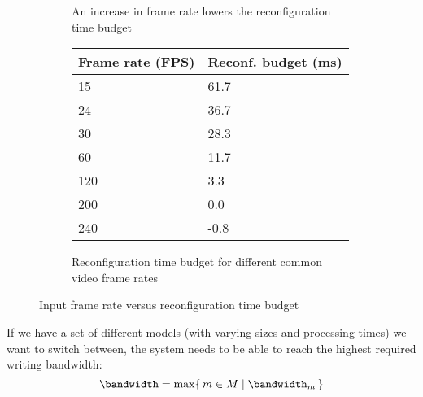 \begin{figure}[htbp]
    \centering
    \begin{subfigure}[b]{0.48\textwidth}
        \begin{adjustbox}{width=\linewidth}
        
        \end{adjustbox}
        \caption{An increase in frame rate lowers the reconfiguration time budget}
        \label{}
    \end{subfigure}
    \hfill
    \begin{subfigure}[b]{0.48\textwidth}
        \begin{tabular}{@{}ll@{}}
        \toprule
        Frame rate (FPS) & Reconf. budget (ms) \\ \midrule
        15               & 61.7                \\
        24               & 36.7                \\
        30               & 28.3                \\
        60               & 11.7                \\
        120              & 3.3                 \\
        200              & 0.0                 \\
        240              & -0.8                \\ \bottomrule
        \end{tabular}
        \caption{Reconfiguration time budget for different common video frame rates}
        \label{tab:common_fps}
    \end{subfigure}
    \caption[]{Input frame rate versus reconfiguration time budget}
    \label{fig:frame_rate_versus_time_budget}
\end{figure}

If we have a set of different models (with varying sizes and processing times) we want to switch between, the system needs to be able to reach the highest required writing bandwidth:
\begin{equation}
    \bandwidth = \max\{\,m \in M \mid \bandwidth_m \,\} 
\end{equation}
